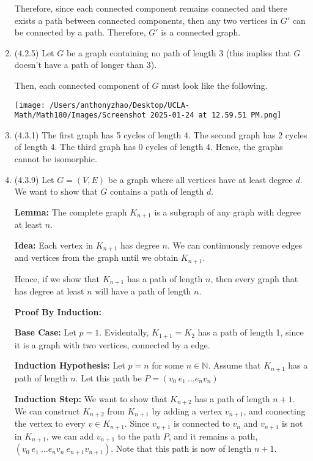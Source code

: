 \documentclass[12pt]{article}
\begin{document}
\begin{enumerate}[start=1,label={\bfseries Problem \arabic*:},leftmargin=1in]
    Therefore, since each connected component remains connected and there exists a path between connected components, then any two vertices in $G'$ can be connected by a path. Therefore, $G'$ is a connected graph. 

    \item (4.2.5) Let $G$ be a graph containing no path of length 3 (this implies that $G$ doesn't have a path of longer than 3). 
    
    Then, each connected component of $G$ must look like the following. 

    \texttt{[image: /Users/anthonyzhao/Desktop/UCLA-Math/Math180/Images/Screenshot 2025-01-24 at 12.59.51 PM.png]}

    \item (4.3.1) 
    The first graph has 5 cycles of length 4. The second graph has 2 cycles of length 4. The third graph has 0 cycles of length 4. Hence, the graphs cannot be isomorphic. 

    \item (4.3.9) Let $G = (V, E)$ be a graph where all vertices have at least degree $d$. We want to  show that $G$ contains a path of length $d$. 
    
    \textbf{Lemma:} The complete graph $K_{n+1}$ is a subgraph of any graph with degree at least $n$. 

    \textbf{Idea:} Each vertex in $K_{n+1}$ has degree $n$. We can continuously remove edges and vertices from the graph until we obtain $K_{n+1}$. 

    Hence, if we show that $K_{n+1}$ has a path of length $n$, then every graph that has degree at least $n$ will have a path of length $n$. 
    
    \textbf{Proof By Induction:} 

    \textbf{Base Case:}
    Let $p = 1$. Evidentally, $K_{1+1} = K_{2}$ has a path of length 1, since it is a graph with two vertices, connected by a edge. 

    \textbf{Induction Hypothesis:}
    Let $p = n$ for some $n \in \mathbb{N}$. Assume that $K_{n+1}$ has a path of length $n$. Let this path be $P = (v_{0} \: e_{1} \: \dots e_{n} v_{n})$

    \textbf{Induction Step:} We want to show that $K_{n+2}$ has a path of length $n+1$. 
    We can construct $K_{n+2}$ from $K_{n+1}$ by adding a vertex $v_{n+1}$, and connecting the vertex to every $v \in K_{n+1}$. Since $v_{n+1}$ is connected to $v_{n}$ and $v_{n+1}$ is not in $K_{n+1}$,
    we can add $v_{n+1}$ to the path $P$, and it remains a path, $(v_{0} \: e_{1} \: \dots e_{n} v_{n} \: e_{n+1} v_{n+1})$. Note that this path is now of length $n+1$. 
    

\end{enumerate}
\end{document}
